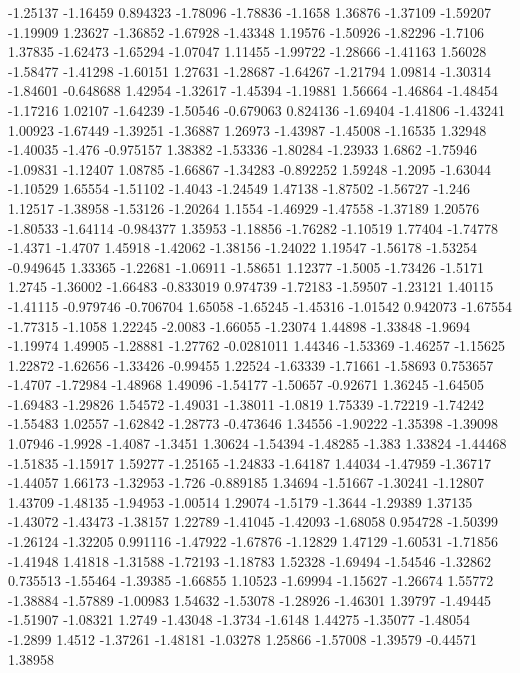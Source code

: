 \documentclass[9pt]{article}
\theoremstyle{plain}
\theoremstyle{definition}
\theoremstyle{remark}
\numberwithin{equation}{section}
\begin{document}
-1.25137
-1.16459
0.894323
-1.78096
-1.78836
-1.1658
1.36876
-1.37109
-1.59207
-1.19909
1.23627
-1.36852
-1.67928
-1.43348
1.19576
-1.50926
-1.82296
-1.7106
1.37835
-1.62473
-1.65294
-1.07047
1.11455
-1.99722
-1.28666
-1.41163
1.56028
-1.58477
-1.41298
-1.60151
1.27631
-1.28687
-1.64267
-1.21794
1.09814
-1.30314
-1.84601
-0.648688
1.42954
-1.32617
-1.45394
-1.19881
1.56664
-1.46864
-1.48454
-1.17216
1.02107
-1.64239
-1.50546
-0.679063
0.824136
-1.69404
-1.41806
-1.43241
1.00923
-1.67449
-1.39251
-1.36887
1.26973
-1.43987
-1.45008
-1.16535
1.32948
-1.40035
-1.476
-0.975157
1.38382
-1.53336
-1.80284
-1.23933
1.6862
-1.75946
-1.09831
-1.12407
1.08785
-1.66867
-1.34283
-0.892252
1.59248
-1.2095
-1.63044
-1.10529
1.65554
-1.51102
-1.4043
-1.24549
1.47138
-1.87502
-1.56727
-1.246
1.12517
-1.38958
-1.53126
-1.20264
1.1554
-1.46929
-1.47558
-1.37189
1.20576
-1.80533
-1.64114
-0.984377
1.35953
-1.18856
-1.76282
-1.10519
1.77404
-1.74778
-1.4371
-1.4707
1.45918
-1.42062
-1.38156
-1.24022
1.19547
-1.56178
-1.53254
-0.949645
1.33365
-1.22681
-1.06911
-1.58651
1.12377
-1.5005
-1.73426
-1.5171
1.2745
-1.36002
-1.66483
-0.833019
0.974739
-1.72183
-1.59507
-1.23121
1.40115
-1.41115
-0.979746
-0.706704
1.65058
-1.65245
-1.45316
-1.01542
0.942073
-1.67554
-1.77315
-1.1058
1.22245
-2.0083
-1.66055
-1.23074
1.44898
-1.33848
-1.9694
-1.19974
1.49905
-1.28881
-1.27762
-0.0281011
1.44346
-1.53369
-1.46257
-1.15625
1.22872
-1.62656
-1.33426
-0.99455
1.22524
-1.63339
-1.71661
-1.58693
0.753657
-1.4707
-1.72984
-1.48968
1.49096
-1.54177
-1.50657
-0.92671
1.36245
-1.64505
-1.69483
-1.29826
1.54572
-1.49031
-1.38011
-1.0819
1.75339
-1.72219
-1.74242
-1.55483
1.02557
-1.62842
-1.28773
-0.473646
1.34556
-1.90222
-1.35398
-1.39098
1.07946
-1.9928
-1.4087
-1.3451
1.30624
-1.54394
-1.48285
-1.383
1.33824
-1.44468
-1.51835
-1.15917
1.59277
-1.25165
-1.24833
-1.64187
1.44034
-1.47959
-1.36717
-1.44057
1.66173
-1.32953
-1.726
-0.889185
1.34694
-1.51667
-1.30241
-1.12807
1.43709
-1.48135
-1.94953
-1.00514
1.29074
-1.5179
-1.3644
-1.29389
1.37135
-1.43072
-1.43473
-1.38157
1.22789
-1.41045
-1.42093
-1.68058
0.954728
-1.50399
-1.26124
-1.32205
0.991116
-1.47922
-1.67876
-1.12829
1.47129
-1.60531
-1.71856
-1.41948
1.41818
-1.31588
-1.72193
-1.18783
1.52328
-1.69494
-1.54546
-1.32862
0.735513
-1.55464
-1.39385
-1.66855
1.10523
-1.69994
-1.15627
-1.26674
1.55772
-1.38884
-1.57889
-1.00983
1.54632
-1.53078
-1.28926
-1.46301
1.39797
-1.49445
-1.51907
-1.08321
1.2749
-1.43048
-1.3734
-1.6148
1.44275
-1.35077
-1.48054
-1.2899
1.4512
-1.37261
-1.48181
-1.03278
1.25866
-1.57008
-1.39579
-0.44571
1.38958
\end{document}

